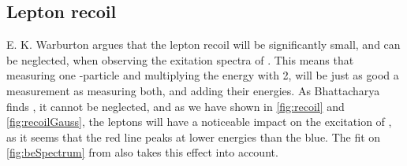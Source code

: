 \subsection{Lepton recoil}
E. K. Warburton \cite{PhysRevC.33.303} argues that the lepton recoil will be significantly small, and can be neglected, when observing the exitation spectra of \ber. This means that measuring one \al-particle and multiplying the energy with 2, will be just as good a measurement as measuring both, and adding their energies. 
As Bhattacharya finds \cite{Bhattacharya:2002gc}, it cannot be neglected, and as we have shown in \cref{fig:recoil} and \cref{fig:recoilGauss}, the leptons will have a noticeable impact on the excitation of \ber, as it seems that the red line peaks at lower energies than the blue. The fit on \cref{fig:beSpectrum} from \cite{bata} also takes this effect into account. 

